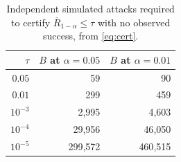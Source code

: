 \begin{table}[t]
\centering
\caption{Independent simulated attacks required to certify $\overline{R}_{1-\alpha} \leq \tau$ with no observed success, from \eqref{eq:cert}.}
\label{tab:cert}
\begin{tabular}{rrr}
\toprule
$\tau$ & $B$ at $\alpha = 0.05$ & $B$ at $\alpha = 0.01$ \\
\midrule
$0.05$ & 59 & 90 \\
$0.01$ & 299 & 459 \\
$10^{-3}$ & 2{,}995 & 4{,}603 \\
$10^{-4}$ & 29{,}956 & 46{,}050 \\
$10^{-5}$ & 299{,}572 & 460{,}515 \\
\bottomrule
\end{tabular}
\end{table}
